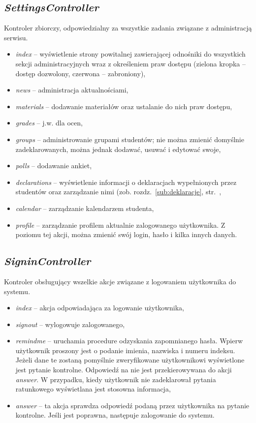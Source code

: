 \documentclass[a4paper,12pt,oneside]{report}
\begin{document}
\subsection{\emph{SettingsController}}
\label{con:settings}
  Kontroler zbiorczy, odpowiedzialny za wszystkie zadania związane z administracją serwisu.
\begin{itemize}
  \item \emph{index} -- wyświetlenie strony powitalnej zawierającej odnośniki do wszystkich sekcji administracyjnych wraz z określeniem praw dostępu (zielona kropka -- dostęp dozwolony, czerwona -- zabroniony),
  \item \emph{news} -- administracja aktualnościami,
  \item \emph{materials} -- dodawanie materiałów oraz ustalanie do nich praw dostępu,
  \item \emph{grades} -- j.w. dla ocen,
  \item \emph{groups} -- administrowanie grupami studentów; nie można zmienić domyślnie zadeklarowanych, można jednak dodawać, usuwać i edytować swoje,
  \item \emph{polls} -- dodawanie ankiet,
  \item \emph{declarations} -- wyświetlenie informacji o deklaracjach wypełnionych przez studentów oraz zarządzanie nimi (zob. rozdz.~\ref{sub:deklaracje}, str.~\pageref{sub:deklaracje},
  \item \emph{calendar} -- zarządzanie kalendarzem studenta,
  \item \emph{profile} -- zarządzanie profilem aktualnie zalogowanego użytkownika. Z poziomu tej akcji, można zmienić swój login, hasło i kilka innych danych.
\end{itemize}

\subsection{\emph{SigninController}}
\label{con:signin}
  Kontroler obsługujący wszelkie akcje związane z logowaniem użytkownika do systemu.
\begin{itemize}
  \item \emph{index} -- akcja odpowiadająca za logowanie użytkownika,
  \item \emph{signout} -- wylogowuje zalogowanego,
  \item \emph{remindme} -- uruchamia procedure odzyskania zapomnianego hasła. Wpierw użytkownik proszony jest o podanie imienia, nazwiska i numeru indeksu. Jeżeli dane te zostaną pomyślnie zweryfikowane użytkownikowi wyświetlone jest pytanie kontrolne. Odpowiedź na nie jest przekierowywana do akcji \emph{answer}. W przypadku, kiedy użytkownik nie zadeklarował pytania ratunkowego wyświetlana jest stosowna informacja,
  \item \emph{answer} -- ta akcja sprawdza odpowiedź podaną przez użytkownika na pytanie kontrolne. Jeśli jest poprawna, następuje zalogowanie do systemu.
\end{itemize}
\end{document}
